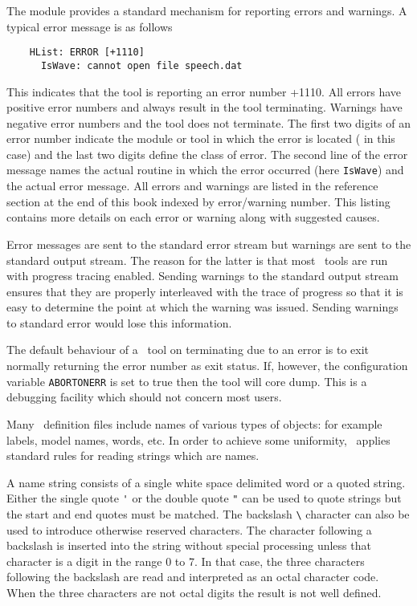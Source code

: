 The  module provides a standard mechanism for reporting
errors and warnings.  
A typical error message is as follows
\begin{verbatim}
    HList: ERROR [+1110]
      IsWave: cannot open file speech.dat
\end{verbatim}
This indicates that the tool  is reporting an error
number +1110.  All errors have positive error 
numbers and always
result in the tool terminating.  Warnings have negative error numbers
and the tool does not terminate.  The first two digits of an error
number indicate the module or tool in which the error is located
( in this case)
and the last two digits define the class of error.
The second line of the error message names the actual routine
in which the error occurred (here \texttt{IsWave}) and the 
actual error message.    All errors and warnings are listed
in the reference section at the end of this book indexed by
error/warning number.  This listing contains more details on each
error or warning along with suggested causes.

Error messages are sent to the  standard error stream but warnings
are sent to the standard output stream.  The reason for the latter
is that most 
\HTK\ tools are run with progress tracing enabled.  Sending warnings
to the standard output stream ensures that they are properly
interleaved with the trace of progress so that it is easy to determine
the point at which the warning was issued.  Sending warnings to
standard error would lose this information.

The default behaviour of a \HTK\ tool on terminating due to an
error is to exit normally returning the error number as exit status.
If, however, the configuration variable 
\texttt{ABORTONERR} is set to
true then the tool will core dump.  This is a debugging facility which
should not concern most users.


Many \HTK\  definition files include names of various types of
objects: for example labels, model names, words, etc.
In order to achieve some uniformity, \HTK\ applies standard
rules for reading strings which are names.

A name string consists of a single white space delimited word or
a quoted string.  Either the single quote \verb+'+ or 
the double quote \verb+"+ can be used to quote strings but the
start and end quotes must be matched.  The backslash \verb+\+ 
character can also
be used to introduce otherwise reserved characters.  The 
character following a backslash is inserted into the string without special
processing unless that character is a digit in the range 0 to 7.  
In that case, the three
characters following the backslash are read and interpreted as an octal
character code.  When the three characters are not octal digits the result
is not well defined.

